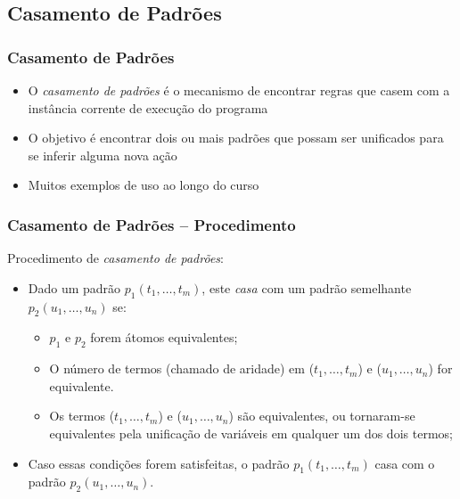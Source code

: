 
\subsection{Casamento de Padrões}

\begin{frame}[fragile]
\frametitle{Casamento de Padrões}

\begin{itemize}

\item O  {\em casamento de padrões} é o mecanismo de  encontrar  regras 
que casem com a instância corrente de execução do programa

\pause
\item O objetivo é encontrar dois ou mais
  padrões que possam ser unificados 
  para se inferir alguma nova ação

\pause
\item Muitos exemplos de uso ao longo do curso

\end{itemize}
\end{frame}



\begin{frame}[fragile]
\frametitle{Casamento de Padrões -- Procedimento}

Procedimento de {\em casamento de padrões}:

\begin{itemize}
	\item Dado um padrão $p_1(t_1, \ldots,t_m)$, este \emph{casa} 
	      com um padrão semelhante $p_2(u_1, \ldots,u_n)$ se:
    
    \begin{itemize}
      	\item $p_1$ e $p_2$ forem átomos equivalentes;
    
        \item O número de termos (chamado de aridade) em ($t_1, \ldots,t_m$)
        e ($u_1, \ldots,u_n$) for equivalente.
    
      	\item Os termos ($t_1, \ldots,t_m$) e ($u_1, \ldots,u_n$) são equivalentes, ou 
    	tornaram-se  equivalentes pela unificação de variáveis	em qualquer um dos dois termos;
    \end{itemize}
    
    \item Caso essas condições forem satisfeitas, o padrão $p_1(t_1,\ldots,t_m)$  
    casa com o padrão $p_2(u_1, \ldots,u_n)$.
    
\end{itemize}        

\end{frame}

